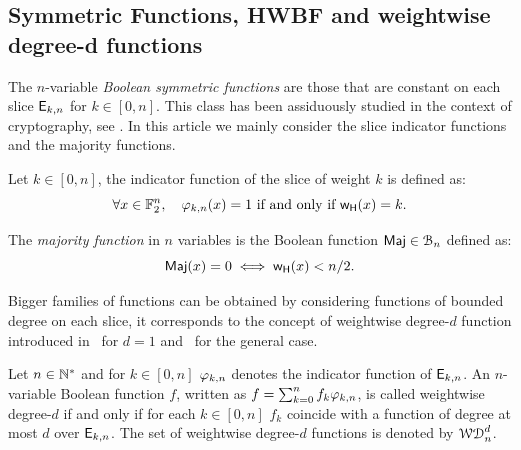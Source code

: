 \documentclass[11pt]{llncs}
\begin{document}
\subsection{Symmetric Functions, HWBF and weightwise degree-d functions}




The $n$-variable \emph{Boolean symmetric functions} are those that are constant on each slice $\mathsf{E}_{k,n}$ for $k\in [0,n]$. 
This class has been assiduously studied in the context of cryptography, see \eg \cite{IEEE:Carlet04,IEEE:CanVid05,INDO:BraPre05,DM:SarMai07,IEEE:QFLW09,IEEE:CheLu11,Latin:Meaux19,CCDS:Meaux21,IEEE:CarMea21}.
In this article we mainly consider the slice indicator functions and the majority functions.
\begin{definition}\label{def:slice}
 Let $k\in [0,n]$, the indicator function of the slice of weight $k$ is defined as:
 \[\forall  x\in \mathbb{F}_2^{n}, \quad \varphi_{k,n}(x) = 1 \text{ if and only if } \mathsf{w_H}(x) = k.\]
\end{definition}


\begin{definition}\label{def:maj}
    The \emph{majority function} in $n$ variables is the Boolean function $\textsf{Maj}\in\mathcal{B}_n$ defined as:
    \[
        \textsf{Maj}(x)=0\iff\mathsf{w_H}(x)<n/2.
    \]
\end{definition}

Bigger families of functions can be obtained by considering functions of bounded degree on each slice, it corresponds to the concept of weightwise degree-$d$ function introduced in~\cite{DAM:GinMea22} for $d=1$ and~\cite{DAM:MeaOza24} for the general case. 

\begin{definition}\label{def:wwdegd}
	Let $n\in \mathbb{N}^*$ and for $k\in[0,n]$ $\varphi_{k,n}$ denotes the indicator function of $\mathsf{E}_{k,n}$. 
	An $n$-variable Boolean function $f$, written as $f=\sum_{k=0}^n f_k \varphi_{k,n}$, is called weightwise degree-$d$ if and only if for each $k\in [0,n]$ $f_k$ coincide with a function of degree at most $d$ over $\mathsf{E}_{k,n}$. 
		The set of weightwise degree-$d$ functions is denoted by $\mathcal{WD}^{d}_{n}$.
\end{definition}
\end{document}
